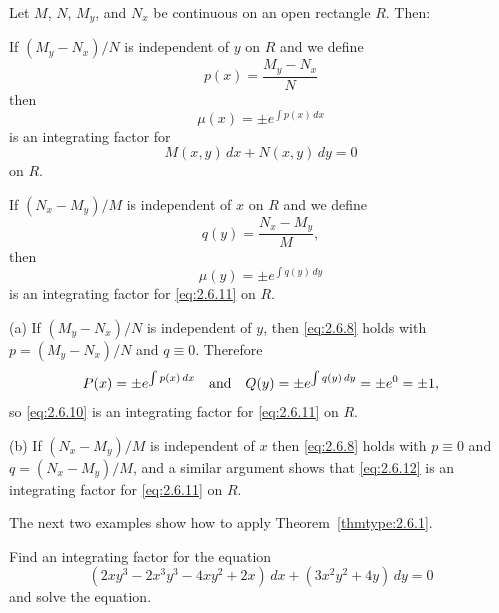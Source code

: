 \begin{theorem}
  \color{blue}
  \label{thmtype:2.6.1} Let $M$, $N$, $M_{y}$, and $N_{x}$ be continuous on an open rectangle $R$.
  Then:
  \begin{alist}
    \item %
    If $(M_{y}-N_{x})/N$ is independent of $y$ on $R$ and we define
    \[
      p(x)=\frac{M_{y}-N_{x}}{N}
    \]
    then
    \begin{equation}
      \label{eq:2.6.10}\mu(x)=\pm e^{\int p(x)\,dx}
    \end{equation}
    is an integrating factor for
    \begin{equation}
      \label{eq:2.6.11}M(x,y)\,dx+N(x,y)\,dy=0
    \end{equation}
    on $R$.

    \item %
    If $(N_{x}-M_{y})/M$ is independent of $x$ on $R$ and we define
    \[
      q(y)=\frac{N_{x}-M_{y}}{M},
    \]
    then
    \begin{equation}
      \label{eq:2.6.12}\mu(y)=\pm e^{\int q(y)\,dy}
    \end{equation}
    is an integrating factor for \eqref{eq:2.6.11} on $R$.
  \end{alist}
\end{theorem}

\medskip

\proof (a) If $(M_{y}-N_{x})/N$ is independent of $y$, then \eqref{eq:2.6.8} holds with
$p=(M_{y}-N_{x})/N$ and $q\equiv0$. Therefore
\[
  P(x)=\pm e^{\int p(x)\,dx}\mbox{\quad and\quad}Q(y)=\pm e^{\int q(y)\,dy}=\pm e^{0}=\pm1,
\]
so \eqref{eq:2.6.10} is an integrating factor for \eqref{eq:2.6.11} on $R$.

(b) If $(N_{x}-M_{y})/M$ is independent of $x$ then \eqref{eq:2.6.8} holds with $p\equiv0$ and
$q=(N_{x}-M_{y})/M$, and a similar argument shows that \eqref{eq:2.6.12} is an integrating factor
for \eqref{eq:2.6.11} on $R$.\bbox

The next two examples show how to apply Theorem~\ref{thmtype:2.6.1}.

\begin{example}
  \label{example:2.6.1} \rm Find an integrating factor for the equation
  \begin{equation}
    \label{eq:2.6.13}(2xy^{3}-2x^{3}y^{3}-4xy^{2}+2x)\,dx+(3x^{2}y^{2}+4y)\,dy=0
  \end{equation}
  and solve the equation.
\end{example}

